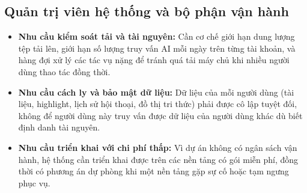 \subsection{Quản trị viên hệ thống và bộ phận vận hành}
\begin{itemize}
    \item \textbf{Nhu cầu kiểm soát tải và tài nguyên:} Cần cơ chế giới hạn dung lượng tệp tải lên, giới hạn số lượng truy vấn AI mỗi ngày trên từng tài khoản, và hàng đợi xử lý các tác vụ nặng để tránh quá tải máy chủ khi nhiều người dùng thao tác đồng thời.
    \item \textbf{Nhu cầu cách ly và bảo mật dữ liệu:} Dữ liệu của mỗi người dùng (tài liệu, highlight, lịch sử hội thoại, đồ thị tri thức) phải được cô lập tuyệt đối, không để người dùng này truy vấn được dữ liệu của người dùng khác dù biết định danh tài nguyên.
    \item \textbf{Nhu cầu triển khai với chi phí thấp:} Vì dự án không có ngân sách vận hành, hệ thống cần triển khai được trên các nền tảng có gói miễn phí, đồng thời có phương án dự phòng khi một nền tảng gặp sự cố hoặc tạm ngưng phục vụ.
\end{itemize}
